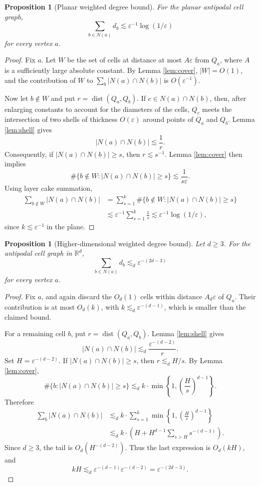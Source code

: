 \documentclass[11pt]{article}
\newtheorem{proposition}[theorem]{Proposition}
\newcommand{\R}{\mathbb R}
\newcommand{\eps}{\varepsilon}
\newcommand{\dist}{\operatorname{dist}}
\begin{document}
\begin{proposition}[Planar weighted degree bound]\label{prop:weighted2}
For the planar antipodal cell graph,
\[
   \sum_{b\in N(a)}d_b
   \lesssim
   \eps^{-1}\log(1/\eps)
\]
for every vertex $a$.
\end{proposition}

\begin{proof}
Fix $a$.  Let $W$ be the set of cells at distance at most $A\eps$ from $Q_a$, where $A$ is a sufficiently large absolute constant.  By Lemma \ref{lem:cover}, $|W|=O(1)$, and the contribution of $W$ to $\sum_b|N(a)\cap N(b)|$ is $O(\eps^{-1})$.

\bigskip
\noindent
Now let $b\notin W$ and put $r=\dist(Q_a,Q_b)$.  If $c\in N(a)\cap N(b)$, then, after enlarging constants to account for the diameters of the cells, $Q_c$ meets the intersection of two shells of thickness $O(\eps)$ around points of $Q_a$ and $Q_b$.  Lemma \ref{lem:shell} gives
\[
   |N(a)\cap N(b)|\lesssim \frac1r.
\]
Consequently, if $|N(a)\cap N(b)|\ge s$, then $r\lesssim s^{-1}$.  Lemma \ref{lem:cover} then implies
\[
   \#\{b\notin W:|N(a)\cap N(b)|\ge s\}
   \lesssim
   \frac1{s\eps}.
\]
Using layer cake summation,
\[
\begin{aligned}
   \sum_{b\notin W}|N(a)\cap N(b)|
   &=
   \sum_{s=1}^{k}\#\{b\notin W:|N(a)\cap N(b)|\ge s\}  \\
   &\lesssim
   \eps^{-1}\sum_{s=1}^{k}\frac1s
   \lesssim
   \eps^{-1}\log(1/\eps),
\end{aligned}
\]
since $k\lesssim\eps^{-1}$ in the plane.
\end{proof}

\begin{proposition}[Higher-dimensional weighted degree bound]\label{prop:weightedD}
Let $d\ge3$.  For the antipodal cell graph in $\R^d$,
\[
   \sum_{b\in N(a)}d_b
   \lesssim_d
   \eps^{-(2d-3)}
\]
for every vertex $a$.
\end{proposition}

\begin{proof}
Fix $a$, and again discard the $O_d(1)$ cells within distance $A_d\eps$ of $Q_a$.  Their contribution is at most $O_d(k)$, with $k\lesssim_d\eps^{-(d-1)}$, which is smaller than the claimed bound.

\bigskip
\noindent
For a remaining cell $b$, put $r=\dist(Q_a,Q_b)$.  Lemma \ref{lem:shell} gives
\[
   |N(a)\cap N(b)|
   \lesssim_d
   \frac{\eps^{-(d-2)}}{r}.
\]
Set $H=\eps^{-(d-2)}$.  If $|N(a)\cap N(b)|\ge s$, then $r\lesssim_d H/s$.  By Lemma \ref{lem:cover},
\[
   \#\{b:|N(a)\cap N(b)|\ge s\}
   \lesssim_d
   k\cdot\min\left\{1,\left(\frac Hs\right)^{d-1}\right\}.
\]
Therefore
\[
\begin{aligned}
   \sum_b|N(a)\cap N(b)|
   &\lesssim_d
   k\cdot\sum_{s=1}^{k}\min\left\{1,\left(\frac Hs\right)^{d-1}\right\} \\
   &\lesssim_d
   k\cdot\left(H+H^{d-1}\sum_{s>H}s^{-(d-1)}\right).
\end{aligned}
\]
Since $d\ge3$, the tail is $O_d(H^{-(d-2)})$.  Thus the last expression is $O_d(kH)$, and
\[
   kH\lesssim_d
   \eps^{-(d-1)}\eps^{-(d-2)}
   =
   \eps^{-(2d-3)}.
\]
\end{proof}
\end{document}
